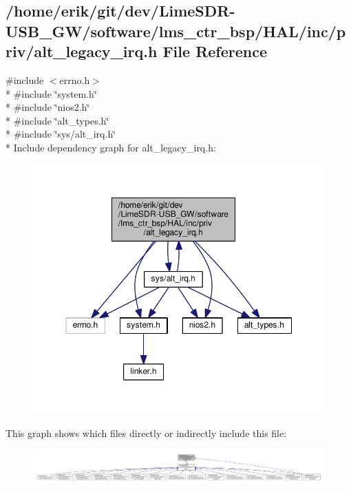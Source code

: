 \subsection{/home/erik/git/dev/\+Lime\+S\+D\+R-\/\+U\+S\+B\+\_\+\+G\+W/software/lms\+\_\+ctr\+\_\+bsp/\+H\+A\+L/inc/priv/alt\+\_\+legacy\+\_\+irq.h File Reference}
\label{alt__legacy__irq_8h}
{\ttfamily \#include $<$errno.\+h$>$}\\*
{\ttfamily \#include \char`\"{}system.\+h\char`\"{}}\\*
{\ttfamily \#include \char`\"{}nios2.\+h\char`\"{}}\\*
{\ttfamily \#include \char`\"{}alt\+\_\+types.\+h\char`\"{}}\\*
{\ttfamily \#include \char`\"{}sys/alt\+\_\+irq.\+h\char`\"{}}\\*
Include dependency graph for alt\+\_\+legacy\+\_\+irq.\+h\+:
\nopagebreak
\begin{figure}[H]
\begin{center}
\leavevmode
\includegraphics[width=350pt]{d0/d3b/alt__legacy__irq_8h__incl}
\end{center}
\end{figure}
This graph shows which files directly or indirectly include this file\+:
\nopagebreak
\begin{figure}[H]
\begin{center}
\leavevmode
\includegraphics[width=350pt]{dc/d4e/alt__legacy__irq_8h__dep__incl}
\end{center}
\end{figure}

